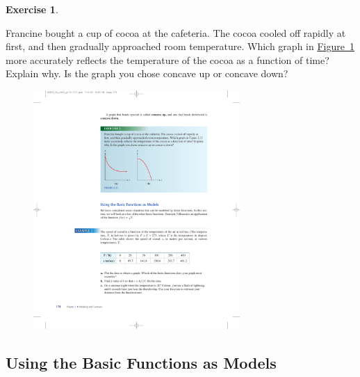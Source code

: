 \documentclass[10pt,]{book}
\theoremstyle{plain}
\theoremstyle{definition}
\theoremstyle{definition}
\theoremstyle{definition}
\theoremstyle{definition}
\theoremstyle{definition}
\newtheorem{exercise}[theorem]{Exercise}
\numberwithin{equation}{section}
\begin{document}
\begin{exercise}\label{exercise-concavity}

    Francine bought a cup of cocoa at the cafeteria. The cocoa cooled off rapidly at first, and then gradually approached room temperature. Which graph in \hyperref[fig-concavity2]{Figure~\ref{fig-concavity2}} more accurately reflects the temperature of the cocoa as a function of time? Explain why. Is the graph you chose concave up or concave down?
    \leavevmode%
\begin{figure}
\centering
\includegraphics[width=0.70\textwidth,]{images/fig-concavity2.pdf}\caption{\label{fig-concavity2}}
\end{figure}
\end{exercise}
\typeout{************************************************}
\typeout{************************************************}
\subsection[Using the Basic Functions as Models]{Using the Basic Functions as Models}\label{subsection-46}
\end{document}

